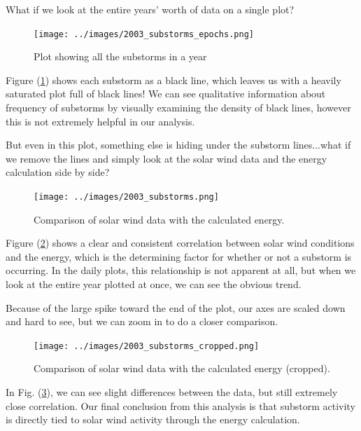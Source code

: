 \documentclass[12pt, letterpaper]{article}
\begin{document}
What if we look at the entire years' worth of data on a single plot?


\begin{figure}[!ht]
  \centering
  \texttt{[image: ../images/2003\_substorms\_epochs.png]}
  \caption{Plot showing all the substorms in a year}
  \label{fig:year}
\end{figure}

Figure (\ref{fig:year}) shows each substorm as a black line, which leaves us with a heavily saturated plot full of black lines! We can see qualitative information about frequency of substorms by visually examining the density of black lines, however this is not extremely helpful in our analysis.

But even in this plot, something else is hiding under the substorm lines...what if we remove the lines and simply look at the solar wind data and the energy calculation side by side?

\begin{figure}[!ht]
  \centering
  \texttt{[image: ../images/2003\_substorms.png]}
  \caption{Comparison of solar wind data with the calculated energy.}
  \label{fig:yearcomp}
\end{figure}

Figure (\ref{fig:yearcomp}) shows a clear and consistent correlation between solar wind conditions and the energy, which is the determining factor for whether or not a substorm is occurring. In the daily plots, this relationship is not apparent at all, but when we look at the entire year plotted at once, we can see the obvious trend.

Because of the large spike toward the end of the plot, our axes are scaled down and hard to see, but we can zoom in to do a closer comparison.

\newpage

\begin{figure}[!ht]
  \centering
  \texttt{[image: ../images/2003\_substorms\_cropped.png]}
  \caption{Comparison of solar wind data with the calculated energy (cropped).}
  \label{fig:yearcrop}
\end{figure}

In Fig. (\ref{fig:yearcrop}), we can see slight differences between the data, but still extremely close correlation. Our final conclusion from this analysis is that substorm activity is directly tied to solar wind activity through the energy calculation. 
\end{document}
